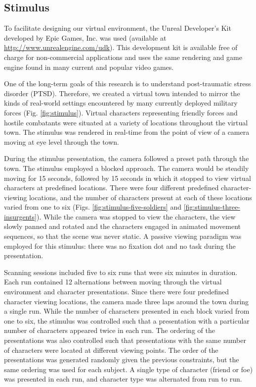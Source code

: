 \documentclass[5p,authoryear]{elsarticle}
\begin{document}
\subsection{Stimulus}
To facilitate designing our virtual environment, the Unreal Developer's Kit developed by Epic Games, Inc. was used (available at \url{http://www.unrealengine.com/udk}).
This development kit is available free of charge for non-commercial applications and uses the same rendering and game engine found in many current and popular video games.

One of the long-term goals of this research is to understand post-traumatic stress disorder (PTSD).
Therefore, we created a virtual town intended to mirror the kinds of real-world settings encountered by many currently deployed military forces (Fig. \ref{fig:stimulus}).
Virtual characters representing friendly forces and hostile combatants were situated at a variety of locations throughout the virtual town.
The stimulus was rendered in real-time from the point of view of a camera moving at eye level through the town. 

During the stimulus presentation, the camera followed a preset path through the town.
The stimulus employed a blocked approach. The camera would be steadily moving for 15 seconds, followed by 15 seconds in which it stopped to view virtual characters at predefined locations.
There were four different predefined character-viewing locations, and the number of characters present at each of these locations varied from one to six (Figs. \ref{fig:stimulus-five-soldiers} and \ref{fig:stimulus-three-insurgents}).
While the camera was stopped to view the characters, the view slowly panned and rotated and the characters engaged in animated movement sequences, so that the scene was never static.
A passive viewing paradigm was employed for this stimulus: there was no fixation dot and no task during the presentation.

Scanning sessions included five to six runs that were six minutes in duration.
Each run contained 12 alternations between moving through the virtual environment and character presentations. 
Since there were four predefined character viewing locations, the camera made three laps around the town during a single run.
While the number of characters presented in each block varied from one to six, the stimulus was controlled such that a presentation with a particular number of characters appeared twice in each run.
The ordering of the presentations was also controlled such that presentations with the same number of characters were located at different viewing points.
The order of the presentations was generated randomly given the previous constraints, but the same ordering was used for each subject.
A single type of character (friend or foe) was presented in each run, and character type was alternated from run to run.
\end{document}
